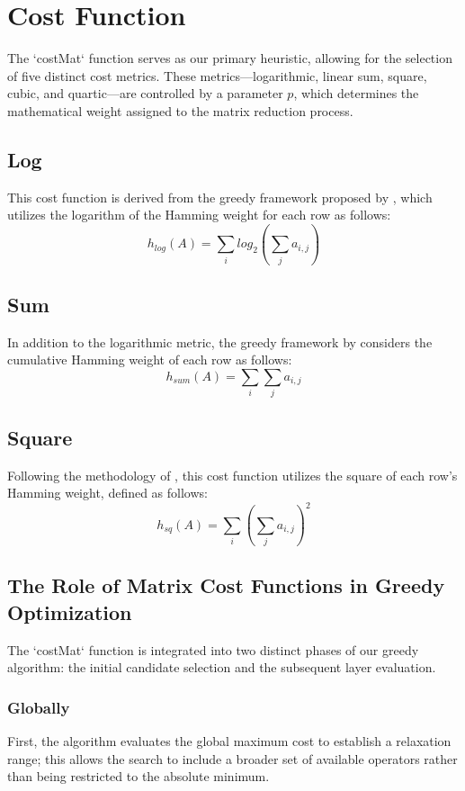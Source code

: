 \chapter{Cost Function}

The `costMat` function serves as our primary heuristic, allowing for the selection of five distinct cost metrics. These metrics—logarithmic, linear sum, square, cubic, and quartic—are controlled by a parameter $p$, which determines the mathematical weight assigned to the matrix reduction process.

\section{Log}
This cost function is derived from the greedy framework proposed by \cite{9475957}, which utilizes the logarithm of the Hamming weight for each row as follows:
$$h_{log}(A) = \sum_{i}log_{2}(\sum_{j}a_{i,j})$$

\section{Sum}
In addition to the logarithmic metric, the greedy framework by \cite{9475957} considers the cumulative Hamming weight of each row as follows:
$$h_{sum}(A) = \sum_{i}\sum_{j}a_{i,j}$$

\section{Square}
Following the methodology of \cite{cryptoeprint:2024/381}, this cost function utilizes the square of each row's Hamming weight, defined as follows:
$$h_{sq}(A) = \sum_{i}(\sum_{j}a_{i,j})^{2}$$

\section{The Role of Matrix Cost Functions in Greedy Optimization}
The `costMat` function is integrated into two distinct phases of our greedy algorithm: the initial candidate selection and the subsequent layer evaluation.

\subsection{Globally}
First, the algorithm evaluates the global maximum cost to establish a relaxation range; this allows the search to include a broader set of available operators rather than being restricted to the absolute minimum.

